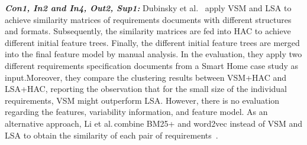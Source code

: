 \documentclass[graybox]{svmult}
\begin{document}


\noindent\textbf{\textit{Con1, In2 and In4, Out2, Sup1:}}
Dubinsky et al.~\cite{AlvesSBRSRPR08} apply VSM and LSA to achieve similarity matrices of requirements documents with different structures and formats. Subsequently, the similarity matrices are fed into HAC to achieve different initial feature trees. 
Finally, the different initial feature trees are merged into the final feature model by manual analysis. In the evaluation, they apply two different requirements specification documents from a Smart Home case study as input.Moreover, they compare the clustering results  between VSM+HAC and LSA+HAC, reporting the observation that for the small size of the individual requirements, VSM might outperform LSA. However, there is no evaluation regarding the features, variability information, and feature model.
As an alternative approach, Li et al.\,combine BM25+ and word2vec instead of VSM and LSA to obtain the similarity of each pair of requirements~\cite{LiSS18}.
\end{document}
